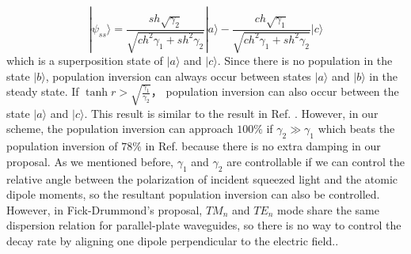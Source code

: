 \documentclass[aps,showpacs,twocolumn,twoside,groupedaddress]{revtex4}
\begin{document}
\begin{equation}
|\psi_{ss}\rangle=\frac{sh\sqrt{\gamma_{2}}}{\sqrt{ch^{2}\gamma_{1}+sh^{2}\gamma_{2}}}|a\rangle-\frac{ch\sqrt{\gamma_{1}}}{\sqrt{ch^{2}\gamma_{1}+sh^{2}\gamma_{2}}}|c\rangle
\end{equation}
which is a superposition state of $|a\rangle$ and $|c\rangle$. Since there is no population in the state $|b\rangle$,  population inversion can always occur between states $|a\rangle$ and $|b\rangle$ in the steady state. If $\tanh r>\sqrt{\frac{\gamma_{1}}{\gamma_{2}}}$， population inversion can also occur between the state $|a\rangle$ and $|c\rangle$. This  result is similar to the result in Ref.  \cite{ficek1993two}. However, in our scheme, the population inversion can approach $100\%$ if $\gamma_2\gg\gamma_1$ which beats the population inversion of $78\%$ in Ref. \cite{ficek1993two} because there is no extra damping in our proposal. As we mentioned before, $\gamma_1$ and $\gamma_2$ are controllable if we can control the relative angle between the polarization of incident squeezed light and the atomic dipole moments, so the resultant population inversion can also be controlled. However, in Fick-Drummond's proposal, $TM_n$ and $TE_n$ mode share the same dispersion relation  for parallel-plate waveguides, so there is no way to control the decay rate by aligning one dipole perpendicular to the electric field..
\end{document}
